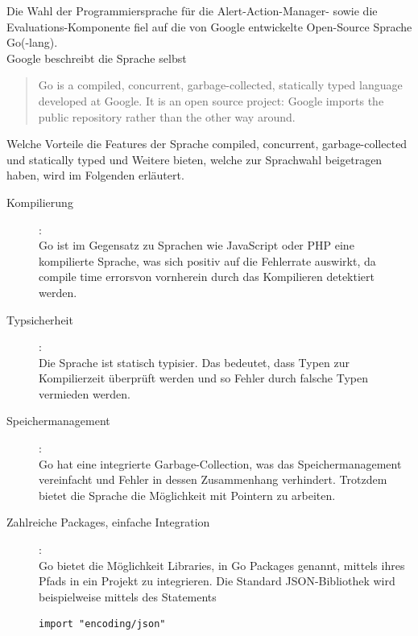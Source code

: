 \documentclass[a4paper,10pt]{scrartcl}
\begin{document}
Die Wahl der Programmiersprache für die \glqq Alert-Action-Manager\grqq- sowie die Evaluations-Komponente fiel auf die von Google entwickelte Open-Source Sprache Go(-lang).\\
Google beschreibt die Sprache selbst
\begin{quote}Go is a compiled, concurrent, garbage-collected, statically typed language developed at Google. It is an open source project: Google imports the public repository rather than the other way around.~\cite{Tien.2019}\end{quote}
Welche Vorteile die Features der Sprache compiled, concurrent, garbage-collected und statically typed und Weitere bieten, welche zur Sprachwahl beigetragen haben, wird im Folgenden erläutert.

\begin{description}
\item[Kompilierung]:\\

Go ist im Gegensatz zu Sprachen wie JavaScript oder PHP eine kompilierte Sprache, was sich positiv auf die Fehlerrate auswirkt, da \glqq compile time errors\grqq von vornherein durch das Kompilieren detektiert werden.\\

\item[Typsicherheit]:\\

Die Sprache ist statisch typisier. Das bedeutet, dass Typen zur Kompilierzeit überprüft werden und so Fehler durch falsche Typen vermieden werden. 

\item[Speichermanagement]:\\

Go hat eine integrierte Garbage-Collection, was das Speichermanagement vereinfacht und Fehler in dessen Zusammenhang verhindert. Trotzdem bietet die Sprache die Möglichkeit mit Pointern zu arbeiten.


\item[Zahlreiche Packages, einfache Integration]:\\

Go bietet die Möglichkeit Libraries, in Go Packages genannt, mittels ihres Pfads in ein Projekt zu integrieren. Die Standard JSON-Bibliothek wird beispielweise mittels des Statements 

\begin{lstlisting}
import "encoding/json"
\end{lstlisting}


\end{description}
\end{document}
